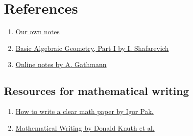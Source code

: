 \documentclass[11pt]{article}
\begin{document}
\section{References}
\label{sec:org9371625}
\begin{enumerate}
\item \href{notes}{Our own notes}
\item \href{https://link.springer.com/book/10.1007/978-3-642-37956-7}{Basic Algebraic Geometry, Part I by I. Shafarevich}
\item \href{https://www.mathematik.uni-kl.de/\~gathmann/class/alggeom-2002/alggeom-2002.pdf}{Online notes by A. Gathmann}
\end{enumerate}
\subsection{Resources for mathematical writing}
\label{sec:org5c382b2}
\begin{enumerate}
\item \href{https://www.math.ucla.edu/\~pak/papers/how-to-write1.pdf}{How to write a clear math paper by Igor Pak.}
\item \href{https://jmlr.csail.mit.edu/reviewing-papers/knuth\_mathematical\_writing.pdf}{Mathematical Writing by Donald Knuth et al.}
\end{enumerate}
\end{document}
